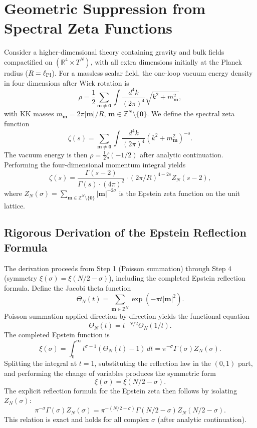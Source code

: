 \documentclass[12pt,a4paper]{article}
\begin{document}
\section{Geometric Suppression from Spectral Zeta Functions}
Consider a higher-dimensional theory containing gravity and bulk fields compactified on \((\mathbb{R}^4 \times T^N)\), with all extra dimensions initially at the Planck radius (\(R = \ell_{\rm Pl}\)). For a massless scalar field, the one-loop vacuum energy density in four dimensions after Wick rotation is
\[
\rho = \frac{1}{2} \sum_{\mathbf{m} \neq \mathbf{0}} \int \frac{d^4k}{(2\pi)^4} \sqrt{k^2 + m_{\mathbf{m}}^2},
\]
with KK masses \(m_{\mathbf{m}} = 2\pi |\mathbf{m}| / R\), \(\mathbf{m} \in \mathbb{Z}^N \setminus \{\mathbf{0}\}\).
We define the spectral zeta function
\[
\zeta(s) = \sum_{\mathbf{m} \neq \mathbf{0}} \int \frac{d^4k}{(2\pi)^4} (k^2 + m_{\mathbf{m}}^2)^{-s}.
\]
The vacuum energy is then \(\rho = \frac{1}{2} \zeta(-1/2)\) after analytic continuation. Performing the four-dimensional momentum integral yields
\[
\zeta(s) = \frac{\Gamma(s-2)}{\Gamma(s) \cdot (4\pi)^2} \cdot (2\pi/R)^{4-2s} Z_N(s-2),
\]
where \(Z_N(\sigma) = \sum_{\mathbf{m} \in \mathbb{Z}^N \setminus \{\mathbf{0}\}} |\mathbf{m}|^{-2\sigma}\) is the Epstein zeta function on the unit lattice.

\subsection{Rigorous Derivation of the Epstein Reflection Formula}
The derivation proceeds from Step 1 (Poisson summation) through Step 4 (symmetry \(\xi(\sigma) = \xi(N/2 - \sigma)\)), including the completed Epstein reflection formula. Define the Jacobi theta function
\[
\Theta_N(t) = \sum_{\mathbf{m} \in \mathbb{Z}^N} \exp(-\pi t |\mathbf{m}|^2).
\]
Poisson summation applied direction-by-direction yields the functional equation
\[
\Theta_N(t) = t^{-N/2} \Theta_N(1/t).
\]
The completed Epstein function is
\[
\xi(\sigma) = \int_0^\infty t^{\sigma-1} (\Theta_N(t) - 1)\, dt = \pi^{-\sigma} \Gamma(\sigma) Z_N(\sigma).
\]
Splitting the integral at \(t=1\), substituting the reflection law in the \((0,1)\) part, and performing the change of variables produces the symmetric form
\[
\xi(\sigma) = \xi(N/2 - \sigma).
\]
The explicit reflection formula for the Epstein zeta then follows by isolating \(Z_N(\sigma)\):
\[
\pi^{-\sigma} \Gamma(\sigma) Z_N(\sigma) = \pi^{-(N/2-\sigma)} \Gamma(N/2-\sigma) Z_N(N/2-\sigma).
\]
This relation is exact and holds for all complex \(\sigma\) (after analytic continuation).
\end{document}
